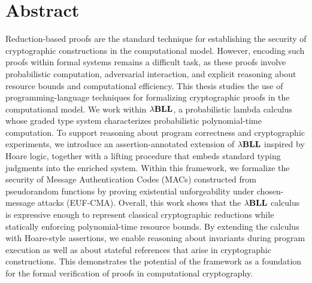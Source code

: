\chapter*{Abstract}

Reduction-based proofs are the standard technique for establishing the security of cryptographic constructions in the computational model. However, encoding such proofs within formal systems remains a difficult task, as these proofs involve probabilistic computation, adversarial interaction, and explicit reasoning about resource bounds and computational efficiency. This thesis studies the use of programming-language techniques for formalizing cryptographic proofs in the computational model. We work within ${\lambda}\mathbf{BLL}$, a probabilistic lambda calculus whose graded type system characterizes probabilistic polynomial-time computation. To support reasoning about program correctness and cryptographic experiments, we introduce an assertion-annotated extension of ${\lambda}\mathbf{BLL}$ inspired by Hoare logic, together with a lifting procedure that embeds standard typing judgments into the enriched system. Within this framework, we formalize the security of Message Authentication Codes (MACs) constructed from pseudorandom functions by proving existential unforgeability under chosen-message attacks (EUF-CMA). Overall, this work shows that the ${\lambda}\mathbf{BLL}$ calculus is expressive enough to represent classical cryptographic reductions while statically enforcing polynomial-time resource bounds. By extending the calculus with Hoare-style assertions, we enable reasoning about invariants during program execution as well as about stateful references that arise in cryptographic constructions. This demonstrates the potential of the framework as a foundation for the formal verification of proofs in computational cryptography.

\clearpage{\pagestyle{empty}\cleardoublepage}
